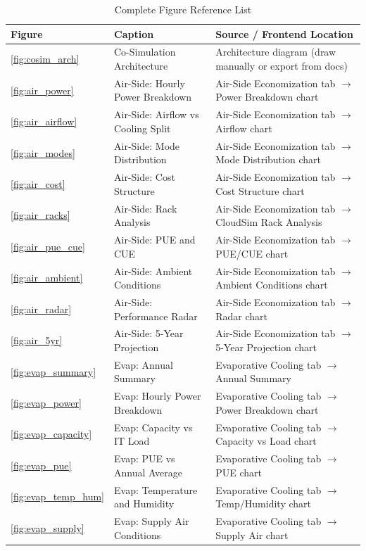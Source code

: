 \documentclass[12pt,a4paper]{report}
\begin{document}
\begin{table}[H]
\centering
\caption{Complete Figure Reference List}
\label{tab:fig_ref}
\renewcommand{\arraystretch}{1.3}
\begin{tabular}{p{2cm}p{5cm}p{7cm}}
\toprule
\textbf{Figure} & \textbf{Caption} & \textbf{Source / Frontend Location} \\
\midrule
\ref{fig:cosim_arch} & Co-Simulation Architecture & Architecture diagram (draw manually or export from docs) \\
\ref{fig:air_power} & Air-Side: Hourly Power Breakdown & Air-Side Economization tab $\to$ Power Breakdown chart \\
\ref{fig:air_airflow} & Air-Side: Airflow vs Cooling Split & Air-Side Economization tab $\to$ Airflow chart \\
\ref{fig:air_modes} & Air-Side: Mode Distribution & Air-Side Economization tab $\to$ Mode Distribution chart \\
\ref{fig:air_cost} & Air-Side: Cost Structure & Air-Side Economization tab $\to$ Cost Structure chart \\
\ref{fig:air_racks} & Air-Side: Rack Analysis & Air-Side Economization tab $\to$ CloudSim Rack Analysis \\
\ref{fig:air_pue_cue} & Air-Side: PUE and CUE & Air-Side Economization tab $\to$ PUE/CUE chart \\
\ref{fig:air_ambient} & Air-Side: Ambient Conditions & Air-Side Economization tab $\to$ Ambient Conditions chart \\
\ref{fig:air_radar} & Air-Side: Performance Radar & Air-Side Economization tab $\to$ Radar chart \\
\ref{fig:air_5yr} & Air-Side: 5-Year Projection & Air-Side Economization tab $\to$ 5-Year Projection chart \\
\ref{fig:evap_summary} & Evap: Annual Summary & Evaporative Cooling tab $\to$ Annual Summary \\
\ref{fig:evap_power} & Evap: Hourly Power Breakdown & Evaporative Cooling tab $\to$ Power Breakdown chart \\
\ref{fig:evap_capacity} & Evap: Capacity vs IT Load & Evaporative Cooling tab $\to$ Capacity vs Load chart \\
\ref{fig:evap_pue} & Evap: PUE vs Annual Average & Evaporative Cooling tab $\to$ PUE chart \\
\ref{fig:evap_temp_hum} & Evap: Temperature and Humidity & Evaporative Cooling tab $\to$ Temp/Humidity chart \\
\ref{fig:evap_supply} & Evap: Supply Air Conditions & Evaporative Cooling tab $\to$ Supply Air chart \\

\end{tabular}
\end{table}
\end{document}
